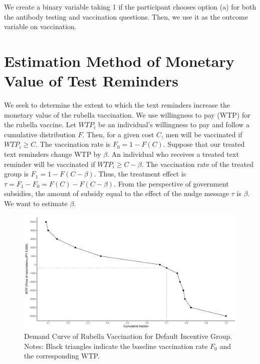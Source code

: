 \documentclass[
]{article}
\begin{document}
We create a binary variable taking 1 if the participant chooses option (a) for both the antibody testing and vaccination questions. Then, we use it as the outcome variable on vaccination.

\clearpage

\hypertarget{method-value}{%
\section{Estimation Method of Monetary Value of Test Reminders}\label{method-value}}

We seek to determine the extent to which the text reminders increase the monetary value of the rubella vaccination. We use willingness to pay (WTP) for the rubella vaccine. Let \(WTP_i\) be an individual's willingness to pay and follow a cumulative distribution \(F\). Then, for a given cost \(C\), men will be vaccinated if \(WTP_i \ge C\). The vaccination rate is \(F_0 = 1-F(C)\). Suppose that our treated text reminders change WTP by \(\beta\). An individual who receives a treated text reminder will be vaccinated if \(WTP_i\ge C-\beta\). The vaccination rate of the treated group is \(F_1 = 1-F(C-\beta)\). Thus, the treatment effect is \(\tau = F_1-F_0=F(C)-F(C-\beta)\). From the perspective of government subsidies, the amount of subsidy equal to the effect of the nudge message \(\tau\) is \(\beta\). We want to estimate \(\beta\).

\begin{figure}[t]
\includegraphics{discussion-paper_files/figure-latex/demand-function-1} \caption{Demand Curve of Rubella Vaccination for Default Incentive Group. Notes: Black triangles indicate the baseline vaccination rate $F_0$ and the corresponding WTP.}\label{fig:demand-function}
\end{figure}
\end{document}
